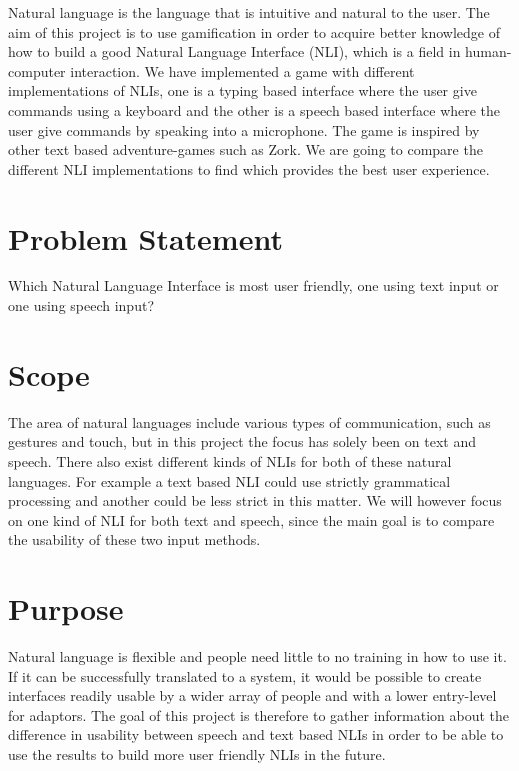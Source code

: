 Natural language is the language that is intuitive and natural to the user. The aim of this project is to use gamification in order to acquire better knowledge of how to build a good Natural Language Interface (NLI), which is a field in human-computer interaction. We have implemented a game with different implementations of NLIs, one is a typing based interface where the user give commands using a keyboard and the other is a speech based interface where the user give commands by speaking into a microphone. The game is inspired by other text based adventure-games such as Zork. We are going to compare the different NLI implementations to find which provides the best user experience.

\section{Problem Statement}
Which Natural Language Interface is most user friendly, one using text input or one using speech input?

\section{Scope}
The area of natural languages include various types of communication, such as gestures and touch, but in this project the focus has solely been on text and speech. There also exist different kinds of NLIs for both of these natural languages. For example a text based NLI could use strictly grammatical processing and another could be less strict in this matter. We will however focus on one kind of NLI for both text and speech, since the main goal is to compare the usability of these two input methods.

\section{Purpose}
Natural language is flexible and people need little to no training in how to use it. If it can be successfully translated to a system, it would be possible to create interfaces readily usable by a wider array of people and with a lower entry-level for adaptors. The goal of this project is therefore to gather information about the difference in usability between speech and text based NLIs in order to be able to use the results to build more user friendly NLIs in the future.


